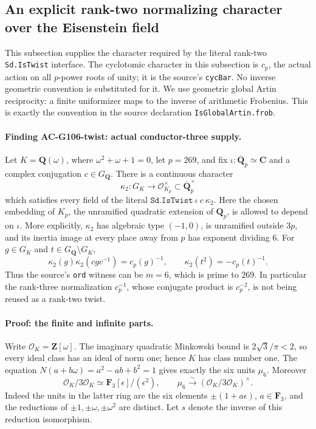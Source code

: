\subsection{An explicit rank-two normalizing character over the Eisenstein field}
\label{sec:cubic-rank-two-cm-twist}

This subsection supplies the character required by the literal rank-two
\texttt{Sd.IsTwist} interface.  The cyclotomic character in this subsection is
\(c_p\), the actual action on all \(p\)-power roots of unity; it is the source's
\texttt{cycBar}.  No inverse geometric convention is substituted for it.
We use geometric global Artin reciprocity: a finite uniformizer maps to the
inverse of arithmetic Frobenius.  This is exactly the convention in the
source declaration \texttt{IsGlobalArtin.frob}.

\paragraph{Finding AC-G106-twist: actual conductor-three supply.}
Let \(K=\mathbf Q(\omega)\), where \(\omega^2+\omega+1=0\), let \(p=269\),
and fix \(\iota:\overline{\mathbf Q}_p\simeq\mathbf C\) and a complex
conjugation \(c\in G_{\mathbf Q}\).  There is a continuous character
\[
 \kappa_2:G_K\longrightarrow\mathcal O_{K_p}^{\times}
       \subset\overline{\mathbf Q}_p^{\times}
 \tag{G106T.1}
\]
which satisfies every field of the literal
\(\texttt{Sd.IsTwist}\ \iota\ c\ \kappa_2\).
Here the chosen embedding of \(K_p\), the unramified quadratic extension
of \(\mathbf Q_p\), is allowed to depend on \(\iota\).  More explicitly,
\(\kappa_2\) has algebraic type \((-1,0)\), is unramified outside \(3p\),
and its inertia image at every place away from \(p\) has exponent dividing
\(6\).  For \(g\in G_K\) and \(t\in G_{\mathbf Q}\setminus G_K\),
\[
 \kappa_2(g)\kappa_2(cgc^{-1})=c_p(g)^{-1},\qquad
 \kappa_2(t^2)=-c_p(t)^{-1}.
 \tag{G106T.2}
\]
Thus the source's \texttt{ord} witness can be \(m=6\), which is prime to
\(269\).  In particular the rank-three normalization \(c_p^{-1}\), whose
conjugate product is \(c_p^{-2}\), is not being reused as a rank-two twist.

\paragraph{Proof: the finite and infinite parts.}
Write \(\mathcal O_K=\mathbf Z[\omega]\).  The imaginary quadratic
Minkowski bound is \(2\sqrt3/\pi<2\), so every ideal class has an ideal
of norm one; hence \(K\) has class number one.  The equation
\(N(a+b\omega)=a^2-ab+b^2=1\) gives exactly the six units
\(\mu_6\).  Moreover
\[
 \mathcal O_K/3\mathcal O_K\simeq
 \mathbf F_3[\epsilon]/(\epsilon^2),\qquad
 \mu_6\xrightarrow{\sim}(\mathcal O_K/3\mathcal O_K)^{\times}.
 \tag{G106T.3}
\]
Indeed the units in the latter ring are the six elements
\(\pm(1+a\epsilon)\), \(a\in\mathbf F_3\), and the reductions of
\(\pm1,\pm\omega,\pm\omega^2\) are distinct.  Let \(s\) denote the
inverse of this reduction isomorphism.


